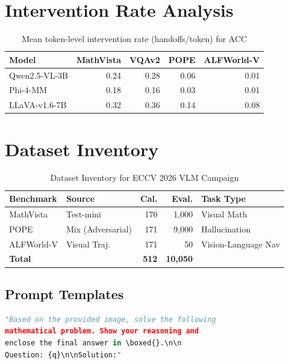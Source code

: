 \documentclass[runningheads]{article} %
\begin{document}
\section{Intervention Rate Analysis}
\label{app:intervention}

\begin{table}[H]
\centering
\caption{Mean token-level intervention rate (handoffs/token) for ACC}
\begin{tabular}{@{}lrrrr@{}}
\toprule
\textbf{Model} & \textbf{MathVista} & \textbf{VQAv2} & \textbf{POPE} & \textbf{ALFWorld-V} \\
\midrule
Qwen2.5-VL-3B  & 0.24 & 0.28 & 0.06 & 0.01 \\
Phi-4-MM       & 0.18 & 0.16 & 0.03 & 0.01 \\
LLaVA-v1.6-7B  & 0.32 & 0.36 & 0.14 & 0.08 \\
\bottomrule
\end{tabular}
\end{table}

\section{Dataset Inventory}
\label{app:data}

\begin{table}[H]
\centering
\caption{Dataset Inventory for ECCV 2026 VLM Campaign}
\begin{tabular}{@{}llrrl@{}}
\toprule
\textbf{Benchmark} & \textbf{Source} & \textbf{Cal.} & \textbf{Eval.} & \textbf{Task Type} \\
\midrule
MathVista & Test-mini & 170 & 1,000 & Visual Math \\
POPE & Mix (Adversarial) & 171 & 9,000 & Hallucination \\
ALFWorld-V & Visual Traj. & 171 & 50 & Vision-Language Nav \\
\midrule
\textbf{Total} & & \textbf{512} & \textbf{10,050} & \\
\bottomrule
\end{tabular}
\end{table}

\subsection{Prompt Templates}

\begin{lstlisting}[language=Python, caption={MathVista}]
"Based on the provided image, solve the following 
mathematical problem. Show your reasoning and 
enclose the final answer in \boxed{}.\n\n
Question: {q}\n\nSolution:"
\end{lstlisting}
\end{document}
